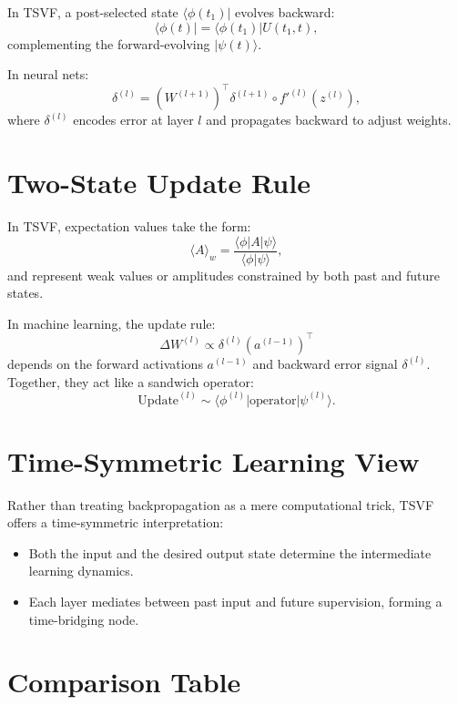 {{{{{{In TSVF, a post-selected state \(\langle\phi(t_1)|\) evolves backward:
\[
\langle \phi(t)| = \langle \phi(t_1)| U(t_1, t),
\]
complementing the forward-evolving \(|\psi(t)\rangle\).

In neural nets:
\[
\delta^{(l)} = (W^{(l+1)})^\top \delta^{(l+1)} \circ f'^{(l)}(z^{(l)}),
\]
where \(\delta^{(l)}\) encodes error at layer \(l\) and propagates backward to adjust weights.

\section{Two-State Update Rule}

In TSVF, expectation values take the form:
\[
\langle A \rangle_w = \frac{\langle \phi | A | \psi \rangle}{\langle \phi | \psi \rangle},
\]
and represent weak values or amplitudes constrained by both past and future states.

In machine learning, the update rule:
\[
\Delta W^{(l)} \propto \delta^{(l)} (a^{(l-1)})^\top
\]
depends on the forward activations \(a^{(l-1)}\) and backward error signal \(\delta^{(l)}\). Together, they act like a sandwich operator:
\[
\text{Update}^{(l)} \sim \langle \phi^{(l)} | \text{operator} | \psi^{(l)} \rangle.
\]

\section{Time-Symmetric Learning View}

Rather than treating backpropagation as a mere computational trick, TSVF offers a time-symmetric interpretation:

\begin{itemize}
  \item Both the input and the desired output state determine the intermediate learning dynamics.
  \item Each layer mediates between past input and future supervision, forming a time-bridging node.
\end{itemize}

\section{Comparison Table}

}}}}}}
